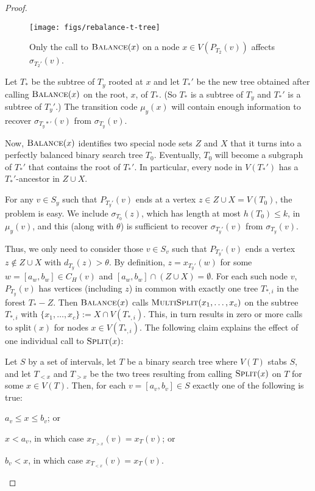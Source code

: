 \documentclass[kpfonts]{patmorin}
\let\le\leqslant
\begin{document}
\begin{proof}
  \begin{figure}
    \begin{center}
      \texttt{[image: figs/rebalance-t-tree]}
    \end{center}
    \caption{Only the call to $\textsc{Balance}(x)$ on a node $x\in V(P_{T_2}(v))$ affects $\sigma_{T_2'}(v)$.}
  \end{figure}
  
  Let $T_*$ be the subtree of $T_y$ rooted at $x$ and let $T_*'$ be the new tree obtained after calling $\textsc{Balance}(x)$ on the root, $x$, of $T_*$. (So $T_*$ is a subtree of $T_y$ and $T_*'$ is a subtree of $T_y'$.)
  The transition code $\mu_y(x)$ will contain enough information to recover $\sigma_{T_y*'}(v)$ from $\sigma_{T_y}(v)$. 
  
  Now, $\textsc{Balance}(x)$ identifies two special node sets $Z$ and $X$ that it turns into a perfectly balanced binary search tree $T_0$.  Eventually, $T_0$ will become a subgraph of $T_*'$ that contains the root of $T_*'$.   In particular, every node in $V(T_*')$ has a $T_*'$-ancestor in $Z\cup X$.
  
  For any $v\in S_y$ such that $P_{T_y'}(v)$ ends at a vertex $z\in Z\cup X=V(T_0)$, the problem is easy.  We include $\sigma_{T_0}(z)$, which has length at most $h(T_0)\le k$, in $\mu_y(v)$, and this (along with $\theta$) is sufficient to recover $\sigma_{T_y'}(v)$ from $\sigma_{T_y}(v)$.

  Thus, we only need to consider those $v\in S_v$ such that $P_{T_y'}(v)$ ends a vertex $z\not\in Z\cup X$ with $d_{T_y}(z)>\theta$.  By definition,  $z=x_{T_y'}(w)$ for some $w=[a_w,b_w]\in C_H(v)$ and $[a_w,b_w]\cap (Z\cup X)=\emptyset$.    For each such node $v$, $P_{T_y}(v)$ has vertices (including $z$) in common with exactly one tree $T_{*,i}$ in the forest $T_*-Z$.  Then $\textsc{Balance}(x)$ calls $\textsc{MultiSplit}(x_1,\ldots,x_c)$ on the subtree $T_{*,i}$ with $\{x_1,\ldots,x_c\}:= X\cap V(T_{*,i})$.  This, in turn results in zero or more calls to $\textrm{split}(x)$ for nodes $x\in V(T_{*,i})$. The following claim explains the effect of one individual call to $\textsc{Split}(x)$:
  
  \begin{clm}
    Let $S$ by a set of intervals, let $T$ be a binary search tree where $V(T)$ stabs $S$, and let $T_{<x}$ and $T_{>x}$ be the two trees resulting from calling $\textsc{Split}(x)$ on $T$ for some $x\in V(T)$.  Then, for each $v=[a_v,b_v]\in S$ exactly one of the following is true:
    \begin{compactenum}
      \item $a_v\le x\le b_v$; or
      \item $x< a_v$, in which case $x_{T_{>x}}(v)=x_T(v)$; or
      \item $b_v < x$, in which case $x_{T_{<x}}(v)=x_T(v)$.
    \end{compactenum}
  \end{clm}


\end{proof}
\end{document}
